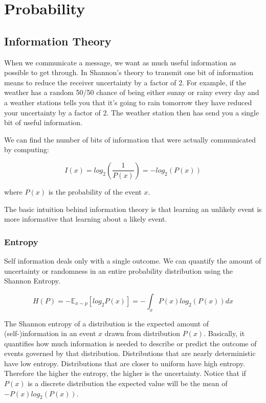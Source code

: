 \chapter{Probability}




\section{Information Theory}

When we communicate a message, we want as much useful information as possible to get through. In Shannon's theory to transmit one bit of information means to reduce the receiver uncertainty by a factor of 2. For example, if the weather has a random 50/50 chance of being either sunny or rainy every day and a weather stations tells you that it's going to rain tomorrow they have reduced your uncertainty by a factor of 2. The weather station then has send you a single bit of useful information.

\noindent We can find the number of bits of information that were actually communicated by computing:

$$I(x) = log_{2} \left( \frac{1}{P(x)} \right)  = -log_{2} \left( P(x) \right)$$

where $P(x)$ is the probability of the event $x$.


\noindent The basic intuition behind information theory is that learning an unlikely event is more informative that learning about a likely event.

\subsection{Entropy}

Self information deals only with a single outcome. We can quantify the amount of uncertainty or randomness in an entire probability distribution using the Shannon Entropy.

$$ H(P) = -\mathbb{E}_{x \sim p} \left[log_2 P(x) \right] = -\int_x {P(x)log_2\left(P(x)\right)dx} $$

\noindent The Shannon entropy of a distribution is the expected amount of (self-)information in an event $x$ drawn from distribution $P(x)$. Basically, it quantifies how much information is needed to describe or predict the outcome  of events governed by that distribution. Distributions that are nearly deterministic have low entropy. Distributions that are closer to uniform have high entropy. Therefore the higher the entropy, the higher is the uncertainty. Notice that if $P(x)$ is a discrete distribution the expected value will be the mean of $-P(x)log_2(P(x))$. 

